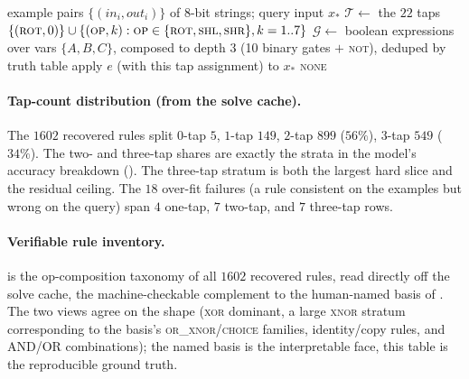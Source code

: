\documentclass[11pt]{article}
\begin{document}
\begin{algorithm}[htbp]
\caption{\textsc{Bit-manipulation}, global single-rule search (98.88\%, 1584/1602)}
\label{alg:bitglobal}
\begin{algorithmic}[1]
\Require example pairs $\{(\mathit{in}_i,\mathit{out}_i)\}$ of 8-bit strings; query input $x_*$
\State $\mathcal{T}\gets$ the $22$ taps $\{(\textsc{rot},0)\}\cup\{(\textsc{op},k):\textsc{op}\in\{\textsc{rot},\textsc{shl},\textsc{shr}\},k=1..7\}$
\State $\mathcal{G}\gets$ boolean expressions over vars $\{A,B,C\}$, composed to depth $3$ (10 binary gates $+$ \textsc{not}), deduped by truth table
     
        \State \Return apply $e$ (with this tap assignment) to $x_*$
      \EndIf
    \EndIf
  \EndFor
\EndFor
\State \Return \textsc{none} 
\end{algorithmic}
\end{algorithm}

\paragraph{Tap-count distribution (from the solve cache).} The $1602$ recovered rules split
$0$-tap $5$, $1$-tap $149$, $2$-tap $899$ ($56\%$), $3$-tap $549$ ($34\%$). The two- and
three-tap shares are exactly the strata in the model's accuracy breakdown
(). The three-tap stratum is both the largest hard slice and the residual
ceiling. The $18$ over-fit failures (a rule consistent on the examples but wrong on the
query) span $4$ one-tap, $7$ two-tap, and $7$ three-tap rows.

\paragraph{Verifiable rule inventory.}  is the op-composition taxonomy of
all $1602$ recovered rules, read directly off the solve cache, the machine-checkable
complement to the human-named basis of . The two views agree on the shape
(\textsc{xor} dominant, a large \textsc{xnor} stratum corresponding to the basis's
\textsc{or\_xnor}/\textsc{choice} families, identity/copy rules, and AND/OR combinations);
the named basis is the interpretable face, this table is the reproducible ground truth.
\end{document}
